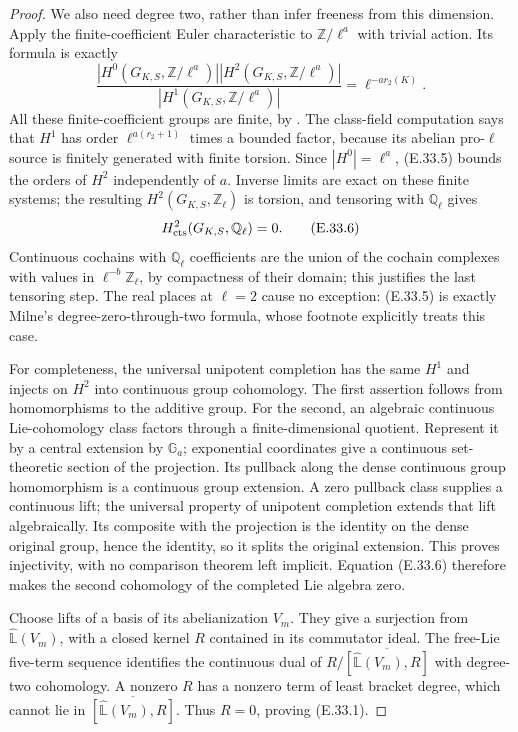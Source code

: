 \begin{proof}
We also need degree two, rather than infer freeness from this
dimension. Apply the finite-coefficient Euler characteristic
\cite[TheoremI.5.1]{E_MilneADT} to $\mathbb Z/\ell^a$ with
trivial action. Its formula is exactly
\[
 \frac{|H^0(G_{K,S},\mathbb Z/\ell^a)|
       |H^2(G_{K,S},\mathbb Z/\ell^a)|}
      {|H^1(G_{K,S},\mathbb Z/\ell^a)|}
       =\ell^{-a r_2(K)}.                               \tag{E.33.5}
\]
All these finite-coefficient groups are finite, by
\cite[CorollaryI.4.15]{E_MilneADT}. The class-field computation says
that $H^1$ has order $\ell^{a(r_2+1)}$ times a bounded factor,
because its abelian pro-$\ell$ source is finitely generated with
finite torsion. Since $|H^0|=\ell^a$, (E.33.5) bounds the orders
of $H^2$ independently of $a$. Inverse limits are exact on these
finite systems; the resulting $H^2(G_{K,S},\mathbb Z_\ell)$
is torsion, and tensoring with $\mathbb Q_\ell$ gives
\[
 H^2_{\rm cts}(G_{K,S},\mathbb Q_\ell)=0.                \tag{E.33.6}
\]
Continuous cochains with $\mathbb Q_\ell$ coefficients are the
union of the cochain complexes with values in
$\ell^{-b}\mathbb Z_\ell$, by compactness of their domain; this
justifies the last tensoring step. The real places at $\ell=2$
cause no exception: (E.33.5) is exactly Milne's degree-zero-through-two
formula, whose footnote explicitly treats this case.

For completeness, the universal unipotent completion has the same
$H^1$ and injects on $H^2$ into continuous group cohomology.
The first assertion follows from homomorphisms to the additive
group. For the second, an algebraic continuous Lie-cohomology
class factors through a finite-dimensional quotient. Represent it
by a central extension by $\mathbb G_a$; exponential coordinates
give a continuous set-theoretic section of the projection.
Its pullback along the dense continuous
group homomorphism is a continuous group extension. A zero pullback
class supplies a continuous lift; the universal property of
unipotent completion extends that lift algebraically. Its composite
with the projection is the identity on the dense original group,
hence the identity, so it splits the original extension. This
proves injectivity, with no comparison theorem left implicit.
Equation (E.33.6) therefore makes the second cohomology of the
completed Lie algebra zero.

Choose lifts of a basis of its abelianization $V_m$. They give a
surjection from $\widehat{\mathbb L}(V_m)$, with a closed kernel
$R$ contained in its commutator ideal. The free-Lie five-term
sequence identifies the continuous dual of
$R/\overline{[\widehat{\mathbb L}(V_m),R]}$ with degree-two cohomology.
A nonzero $R$ has a nonzero term of least bracket degree, which
cannot lie in $\overline{[\widehat{\mathbb L}(V_m),R]}$. Thus $R=0$,
proving (E.33.1).


\end{proof}
